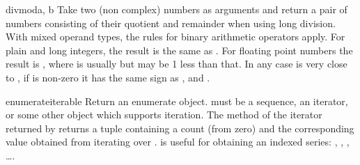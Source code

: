 \begin{funcdesc}{divmod}{a, b}
  Take two (non complex) numbers as arguments and return a pair of numbers
  consisting of their quotient and remainder when using long division.  With
  mixed operand types, the rules for binary arithmetic operators apply.  For
  plain and long integers, the result is the same as
  .
  For floating point numbers the result is , where  is usually  but may be 1 less than that.  In any case  is very close to , if
   is non-zero it has the same sign as
  , and .

\end{funcdesc}

\begin{funcdesc}{enumerate}{iterable}
  Return an enumerate object.  must be a sequence, an iterator, or
  some other object which supports iteration.  The  method of
  the iterator returned by  returns a tuple containing a
  count (from zero) and the corresponding value obtained from iterating over
  .   is useful for obtaining an indexed
  series: , , , \ldots.
\end{funcdesc}

